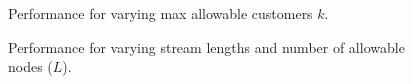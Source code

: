 \begin{figure}[t] 
	\begin{center}
		\caption{Performance for varying max allowable customers $k$.}
		\label{fig: varying_max_customers}
	\end{center} 
\end{figure} 

\begin{figure}[t] 
	\begin{center}
		\caption{Performance for varying stream lengths and number of allowable nodes ($L$).}
		\label{fig:varying_stream_length}
	\end{center} 
\end{figure} 